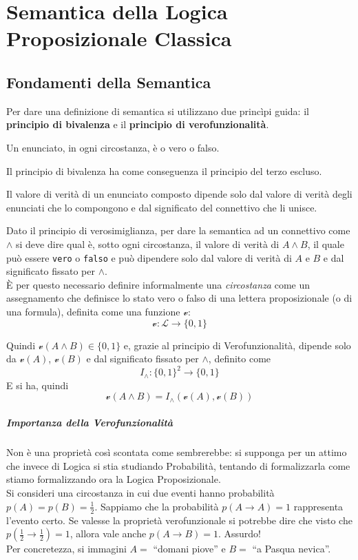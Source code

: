 \chapter{Semantica della Logica Proposizionale Classica}
\section{Fondamenti della Semantica}
Per dare una definizione di semantica si utilizzano due princìpi guida: il 
\textbf{principio di bivalenza} e il \textbf{principio di verofunzionalità}. 

\begin{pri}[Bivalenza]
Un enunciato, in ogni circostanza, è o vero o falso.
\end{pri}

Il principio di bivalenza ha come conseguenza il principio del terzo escluso. 

\begin{pri}
Il valore di verità di un enunciato composto dipende solo dal valore di verità 
degli enunciati che lo compongono e dal significato del connettivo che li unisce. 
\end{pri}

Dato il principio di verosimiglianza, per dare la semantica ad un connettivo come $\land$ si deve dire qual è, sotto ogni circostanza, il valore di verità di $A \land B$, il quale può essere \texttt{vero} o \texttt{falso} e può dipendere solo dal valore di verità di $A$ e $B$ e dal significato fissato per $\land$. \\
\`E per questo necessario definire informalmente una \textit{circostanza} come un assegnamento che definisce lo stato vero o falso di una lettera proposizionale (o di una formula), definita come una funzione $\mathcal{v}$:
$$
\mathcal{v} : \mathscr{L} \rightarrow \{0,1\}
$$

Quindi $\mathcal{v}(A \land B) \in \{0,1\}$ e, grazie al principio di Verofunzionalità, 
dipende solo da $\mathcal{v}(A)$, 
$\mathcal{v}(B)$ e dal significato fissato per $\land$, definito come 
$$
I_{\land}: \{0,1\}^2 \rightarrow \{0,1\}
$$
E si ha, quindi
$$
\mathcal{v}(A \land B ) = I_{\land} (\mathcal{v}(A), \mathcal{v}(B))
$$
\paragraph{Importanza della Verofunzionalità}
Non è una proprietà così scontata come sembrerebbe: si supponga per un attimo che invece di Logica si stia studiando Probabilità, tentando di formalizzarla come stiamo formalizzando ora la Logica Proposizionale. \\
Si consideri una circostanza in cui due eventi hanno probabilità $p(A) = p(B) = \frac{1}{2}$. Sappiamo che la probabilità $p(A \rightarrow A) = 1$ rappresenta l'evento certo. Se valesse la proprietà verofunzionale si potrebbe dire che visto che $p(\frac{1}{2} \rightarrow \frac{1}{2}) = 1$, allora vale anche $p(A \rightarrow B) = 1$. Assurdo! \\
Per concretezza, si immagini $A = $ ``domani piove'' e $B = $ ``a Pasqua nevica''.

